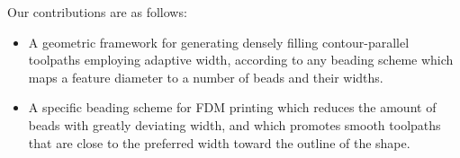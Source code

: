 Our contributions are as follows:
\begin{itemize}
\item A geometric framework for generating densely filling contour-parallel toolpaths employing adaptive width, according to any beading scheme which maps a feature diameter to a number of beads and their widths.
\item A specific beading scheme for FDM printing which reduces the amount of beads with greatly deviating width, and which promotes smooth toolpaths that are close to the preferred width toward the outline of the shape.
\end{itemize}




